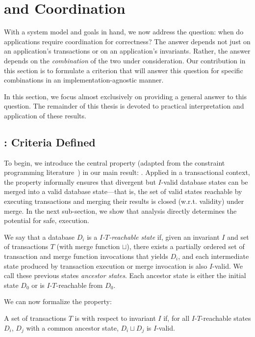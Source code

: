 
\chapter{\IConfluence and Coordination}
\label{c.iconfluence}

With a system model and goals in hand, we now address the question:
when do applications require coordination for correctness? The answer
depends not just on an application's transactions or on an 
application's invariants. Rather, the answer depends on the
\textit{combination} of the two under consideration. Our contribution
in this section is to formulate a criterion that will answer this
question for specific combinations in an implementation-agnostic
manner.

In this section, we focus almost exclusively on providing a general
answer to this question. The remainder of this thesis is devoted to
practical interpretation and application of these results.

\section{\IConfluence: Criteria Defined}
\label{sec:ic-defs}

To begin, we introduce the central property (adapted from the
constraint programming literature~\cite{obs-confluence}) in our main
result: \iconfluence. Applied in a transactional context, the
\iconfluence property informally ensures that divergent but $I$-valid
database states can be merged into a valid database state---that is,
the set of valid states reachable by executing transactions and
merging their results is closed (w.r.t. validity) under merge. In the
next sub-section, we show that \iconfluence analysis directly
determines the potential for safe, \cfree execution.

We say that a database $D_i$ is a \textit{$I$-$T$-reachable state} if,
given an invariant $I$ and set of transactions $T$ (with merge
function $\sqcup$), there exists a partially ordered set of
transaction and merge function invocations that yields $D_i$, and each
intermediate state produced by transaction execution or merge
invocation is also $I$-valid. We call these previous states
\textit{ancestor states}. Each ancestor state is either the
initial state $D_0$ or is $I$-$T$-reachable from $D_0$.

We can now formalize the \iconfluence property:

\begin{definition}[\IConfluence]
  A set of transactions $T$ is \iconfluent with respect to invariant
  $I$ if, for all $I$-$T$-reachable states $D_i$, $D_j$ with a common
  ancestor state, $D_i \sqcup D_j$ is $I$-valid.
\end{definition}

